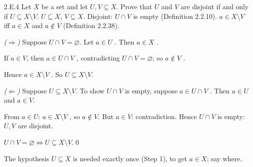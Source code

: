 \begin{bookex}[recommended]{2.E.4}
Let $X$ be a set and let $U,V\subseteq X$. Prove that $U$ and $V$ are disjoint if and only if $U\subseteq X\setminus V$.
\solution
\given $U\subseteq X$, $V\subseteq X$. Disjoint: $U\cap V$ is empty (Definition 2.2.10). $a\in X\setminus V$ iff $a\in X$ and $a\notin V$ (Definition 2.2.38).
\begin{steps}
\item \emph{($\Rightarrow$)} Suppose $U\cap V=\varnothing$. Let $a\in U$ . Then $a\in X$ .
\item If $a\in V$, then $a\in U\cap V$ , contradicting $U\cap V=\varnothing$; so $a\notin V$ .
\item Hence $a\in X\setminus V$ . So $U\subseteq X\setminus V$.
\item \emph{($\Leftarrow$)} Suppose $U\subseteq X\setminus V$. To show $U\cap V$ is empty, suppose $a\in U\cap V$ . Then $a\in U$ and $a\in V$.
\item From $a\in U$: $a\in X\setminus V$ , so $a\notin V$. But $a\in V$: contradiction. Hence $U\cap V$ is empty: $U,V$ are disjoint.
\end{steps}
\conclusion $U\cap V=\varnothing\Leftrightarrow U\subseteq X\setminus V$.\qed
\begin{compare}
\item The hypothesis $U\subseteq X$ is needed exactly once (Step 1), to get $a\in X$; say where.
\end{compare}
\end{bookex}

